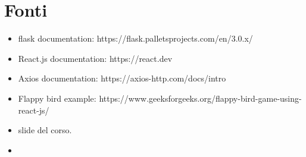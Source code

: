 \documentclass{article}
\begin{document}
\section{Fonti}
\begin{itemize}
    \item flask documentation: https://flask.palletsprojects.com/en/3.0.x/
    \item React.js documentation: https://react.dev
    \item Axios documentation: https://axios-http.com/docs/intro
    \item Flappy bird example: https://www.geeksforgeeks.org/flappy-bird-game-using-react-js/
    \item slide del corso.
    \item  
\end{itemize}
\end{document}

